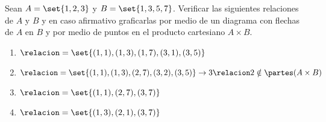 \begin{enunciado}{\ejercicio}
  Sean $A = \set{1, 2, 3}$ y $B = \set{1, 3, 5, 7}$. Verificar las siguientes
  relaciones de $A$ y $B$ y en caso afirmativo graficarlas por medio de un diagrama
  con flechas de $A$ en $B$ y por medio de puntos en el producto cartesiano $A \times B$.
\end{enunciado}
\begin{enumerate}[label=\roman*)]
  \item
        \begin{minipage}{1\textwidth}
          \begin{minipage}{0.5\textwidth}
            $\relacion = \set{(1,1), (1,3), (1,7), (3,1), (3,5)}$
          \end{minipage}
          \begin{minipage}{0.25\textwidth}
            \diecisietei
          \end{minipage}
        \end{minipage}

  \item $\relacion =
          \set{(1,1), (1,3), (2,7), (3,2), (3,5)}
          \to
          3 \relacion 2 \notin \partes(A \times B) $

  \item $\relacion = \set{(1,1), (2,7), (3,7)}$
        \Hacer

  \item $\relacion = \set{(1,3), (2,1), (3,7)}$
        \Hacer
\end{enumerate}
